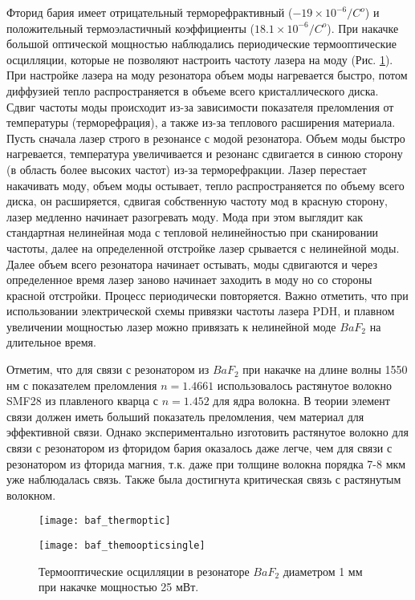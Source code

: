 Фторид бария имеет отрицательный терморефрактивный ($-19\times10^{-6}/C^{o}$) и положительный термоэластичный коэффициенты ($18.1\times10^{-6}/C^{o}$). При накачке большой оптической мощностью наблюдались периодические термооптические осцилляции, которые не позволяют настроить частоту лазера на моду (Рис. \ref{baf_thermoptic}). При настройке лазера на моду резонатора объем моды нагревается быстро, потом диффузией тепло распространяется в объеме всего кристаллического диска. Сдвиг частоты моды происходит из-за зависимости показателя преломления от температуры (терморефрация), а также из-за теплового расширения материала. Пусть сначала лазер строго в резонансе с модой резонатора. Объем моды быстро нагревается, температура увеличивается и резонанс сдвигается в синюю сторону (в область более высоких частот) из-за терморефракции. Лазер перестает накачивать моду, объем моды остывает, тепло распространяется по объему всего диска, он расширяется, сдвигая собственную частоту мод в красную сторону, лазер медленно начинает разогревать моду. Мода при этом выглядит как стандартная нелинейная мода с тепловой нелинейностью при сканировании частоты, далее на определенной отстройке лазер срывается с нелинейной моды. Далее объем всего резонатора начинает остывать, моды сдвигаются и через определенное время лазер заново начинает заходить в моду но со стороны красной отстройки. Процесс периодически повторяется. Важно отметить, что при использовании электрической схемы привязки частоты лазера PDH, и плавном увеличении мощностью лазер можно привязать к нелинейной моде $BaF_2$ на длительное время.

Отметим, что для связи с резонатором из $BaF_2$ при накачке на длине волны 1550 нм с показателем преломления $n=1.4661$ использовалось растянутое волокно SMF28 из плавленого кварца с $n=1.452$ для ядра волокна. В теории элемент связи должен иметь больший показатель преломления, чем материал для эффективной связи. Однако экспериментально изготовить растянутое волокно для связи с резонатором из фторидом бария оказалось даже легче, чем для связи с резонатором из фторида магния, т.к. даже при толщине волокна порядка 7-8 мкм уже наблюдалась связь. Также была достигнута критическая связь с растянутым волокном.

\begin{figure}[ht]
\begin{minipage}[ht]{0.49\linewidth}\centering
    \texttt{[image: baf\_thermoptic]}
  \end{minipage}
  \hfill
  \begin{minipage}[ht]{0.49\linewidth}\centering
    \texttt{[image: baf\_themoopticsingle]}
  \end{minipage}
    \caption{Термооптические осцилляции в резонаторе $BaF_2$ диаметром 1 мм при накачке мощностью 25 мВт.}
  \label{baf_thermoptic}
\end{figure}

